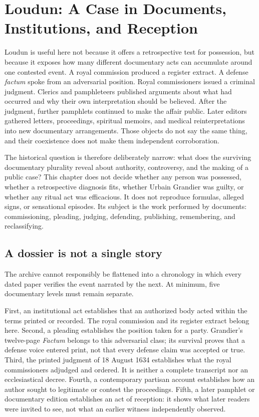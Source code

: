 \section{Loudun: A Case in Documents, Institutions, and Reception}

Loudun is useful here not because it offers a retrospective test for
possession, but because it exposes how many different documentary acts can
accumulate around one contested event.  A royal commission produced a
register extract.  A defense \emph{factum} spoke from an adversarial position.
Royal commissioners issued a criminal judgment.  Clerics and pamphleteers
published arguments about what had occurred and why their own interpretation
should be believed.  After the judgment, further pamphlets continued to make
the affair public.  Later editors gathered letters, proceedings, spiritual
memoirs, and medical reinterpretations into new documentary arrangements.
Those objects do not say the same thing, and their coexistence does not make
them independent corroboration.

The historical question is therefore deliberately narrow: what does the
surviving documentary plurality reveal about authority, controversy, and the
making of a public case?  This chapter does not decide whether any person was
possessed, whether a retrospective diagnosis fits, whether Urbain Grandier was
guilty, or whether any ritual act was efficacious.  It does not reproduce
formulas, alleged signs, or sensational episodes.  Its subject is the work
performed by documents: commissioning, pleading, judging, defending,
publishing, remembering, and reclassifying.

\subsection{A dossier is not a single story}

The archive cannot responsibly be flattened into a chronology in which every
dated paper verifies the event narrated by the next.  At minimum, five
documentary levels must remain separate.

First, an institutional act establishes that an authorized body acted within
the terms printed or recorded.  The royal commission and its register extract
belong here.  Second, a pleading establishes the position taken for a party.
Grandier's twelve-page \emph{Factum} belongs to this adversarial class; its
survival proves that a defense voice entered print, not that every defense
claim was accepted or true.  Third, the printed judgment of 18 August 1634
establishes what the royal commissioners adjudged and ordered.  It is neither
a complete transcript nor an ecclesiastical decree.  Fourth, a contemporary
partisan account establishes how an author sought to legitimate or contest the
proceedings.  Fifth, a later pamphlet or documentary edition establishes an
act of reception: it shows what later readers were invited to see, not what an
earlier witness independently observed.

